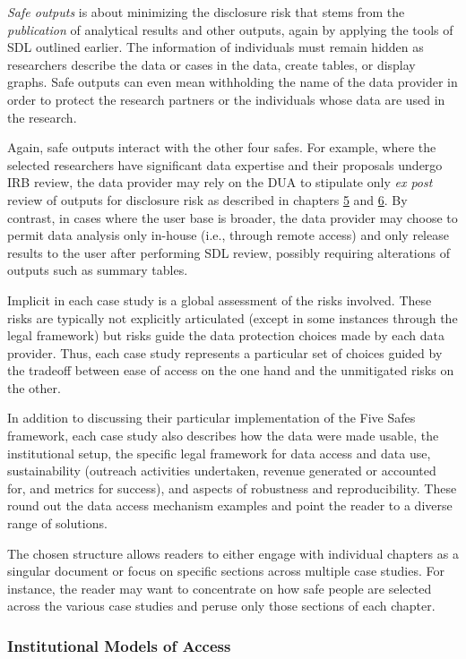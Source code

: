 \documentclass[
]{WileySix}
\begin{document}
\emph{Safe outputs} is about minimizing the disclosure risk that stems from the \emph{publication} of analytical results and other outputs, again by applying the tools of SDL outlined earlier. The information of individuals must remain hidden as researchers describe the data or cases in the data, create tables, or display graphs. Safe outputs can even mean withholding the name of the data provider in order to protect the research partners or the individuals whose data are used in the research.

Again, safe outputs interact with the other four safes. For example, where the selected researchers have significant data expertise and their proposals undergo IRB review, the data provider may rely on the DUA to stipulate only \emph{ex post} review of outputs for disclosure risk as described in chapters \protect\hyperlink{discavoid}{5} and \protect\hyperlink{diffpriv}{6}. By contrast, in cases where the user base is broader, the data provider may choose to permit data analysis only in-house (i.e., through remote access) and only release results to the user after performing SDL review, possibly requiring alterations of outputs such as summary tables.

Implicit in each case study is a global assessment of the risks involved. These risks are typically not explicitly articulated (except in some instances through the legal framework) but risks guide the data protection choices made by each data provider. Thus, each case study represents a particular set of choices guided by the tradeoff between ease of access on the one hand and the unmitigated risks on the other.

In addition to discussing their particular implementation of the Five Safes framework, each case study also describes how the data were made usable, the institutional setup, the specific legal framework for data access and data use, sustainability (outreach activities undertaken, revenue generated or accounted for, and metrics for success), and aspects of robustness and reproducibility. These round out the data access mechanism examples and point the reader to a diverse range of solutions.

The chosen structure allows readers to either engage with individual chapters as a singular document or focus on specific sections across multiple case studies. For instance, the reader may want to concentrate on how safe people are selected across the various case studies and peruse only those sections of each chapter.

\hypertarget{institutional-models-of-access}{%
\subsubsection{Institutional Models of Access}\label{institutional-models-of-access}}
\end{document}
